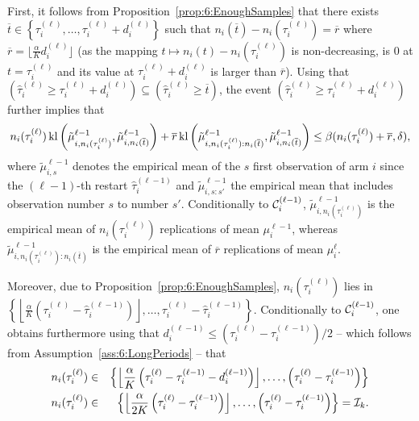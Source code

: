 First, it follows from Proposition~\ref{prop:6:EnoughSamples} that there exists $\overline{t} \in \left\{\tau_i^{(\ell)}, \dots, \tau_i^{(\ell)} + d_i^{(\ell)} \right\}$ such that
$n_i(\overline{t}) - n_i(\tau_i^{(\ell)}) = \overline{r}$ where $\overline{r} = \lfloor \frac{\alpha}{K} d_i^{(\ell)}\rfloor$
(as the mapping $t\mapsto n_i(t) - n_i(\tau_i^{(\ell)})$ is non-decreasing, is $0$ at $t=\tau_i^{(\ell)}$ and its value at $\tau_i^{(\ell)}+d_i^{(\ell)}$ is larger than $\overline{r}$).
Using that $(\widehat{\tau}_i^{(\ell)} \geq \tau_i^{(\ell)} + d_i^{(\ell)}) \subseteq (\widehat{\tau}_i^{(\ell)} \geq \overline{t})$,
the event $(\widehat{\tau}_i^{(\ell)} \geq \tau_i^{(\ell)} + d_i^{(\ell)})$ further implies that
\[
    n_i(\tau_i^{(\ell)}) \, \mathrm{kl}\left(\tilde{\mu}^{\ell-1}_{i,n_i(\tau_i^{(\ell)})},\tilde{\mu}^{\ell-1}_{i,n_i(\overline{t})}\right)
    +  \overline{r} \, \mathrm{kl}\left(\tilde{\mu}^{\ell-1}_{i,n_i(\tau_i^{(\ell)}) : n_i(\overline{t})},\tilde{\mu}^{\ell-1}_{i,n_i(\overline{t})}\right) \leq \beta(n_i(\tau_i^{(\ell)}) + \overline{r},\delta),
\]
where $\tilde{\mu}^{\ell-1}_{i,s}$ denotes the empirical mean of the $s$ first observation of arm $i$ since the $(\ell-1)$-th restart $\hat{\tau}_i^{(\ell-1)}$ and  $\tilde{\mu}^{\ell-1}_{i,s:s'}$ the empirical mean that includes observation number $s$ to number $s'$. Conditionally to $\mathcal{C}^{(\ell-1)}_i$, $\tilde{\mu}^{\ell-1}_{i,n_i(\tau_i^{(\ell)})}$ is the empirical mean of $n_i(\tau_i^{(\ell)})$ \iid{} replications of mean $\mu_i^{\ell-1}$, whereas $\tilde{\mu}^{\ell-1}_{i,n_i(\tau_i^{(\ell)}) : n_i(\overline{t})}$ is the empirical mean of $\overline{r}$ \iid{} replications of mean $\mu_i^{\ell}$.

Moreover, due to Proposition~\ref{prop:6:EnoughSamples}, $n_i(\tau_i^{(\ell)})$ lies in $
\left\{\left\lfloor \frac{\alpha}{K}\left(\tau_i^{(\ell)}-\widehat{\tau}_i^{(\ell-1)}\right)\right\rfloor, \dots, \tau_i^{(\ell)}-\widehat{\tau}_i^{(\ell-1)} \right\}$.
%
Conditionally to $\mathcal{C}_i^{(\ell-1)}$, one obtains furthermore using that $d_i^{(\ell-1)} \leq (\tau_i^{(\ell)} - \tau_i^{(\ell-1)})/2$ -- which follows from Assumption~\ref{ass:6:LongPeriods} -- that
\begin{eqnarray*}
    n_i(\tau_i^{(\ell)})& \in &  \left\{ \left\lfloor \frac{\alpha}{K}\left(\tau_i^{(\ell)}-\tau_i^{(\ell-1)} - d_i^{(\ell-1)}\right)\right\rfloor, \dots, \left(\tau_i^{(\ell)}-\tau_i^{(\ell-1)}\right) \right\} \\
    n_i(\tau_i^{(\ell)})& \in& \left\{ \left\lfloor \frac{\alpha}{2K}\left(\tau_i^{(\ell)}-\tau_i^{(\ell-1)}\right)\right\rfloor, \dots, \left(\tau_i^{(\ell)}-\tau_i^{(\ell-1)}\right) \right\} = \mathcal{I}_k.
\end{eqnarray*}

